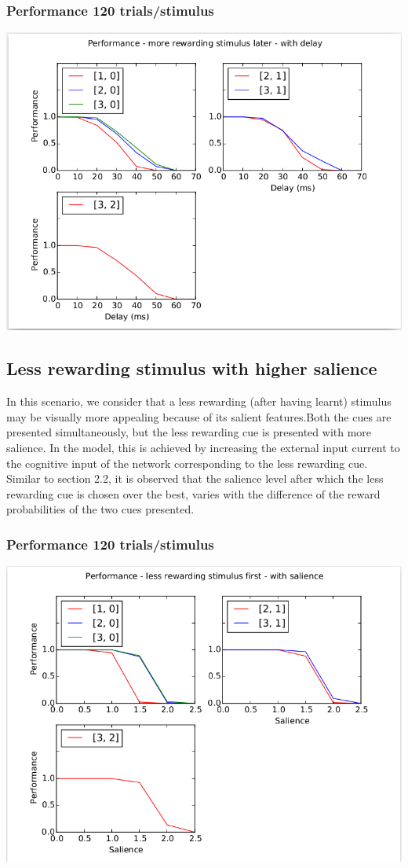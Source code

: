 \documentclass[11pt]{article}
\begin{document}
\subsubsection{Performance 120 trials/stimulus}
\includegraphics[clip=true, trim=25 35 0 35, scale=.7]{perf_with_delays.png}

\subsection{Less rewarding stimulus with higher salience}
In this scenario, we consider that a less rewarding (after having learnt) stimulus may be visually more appealing because of its salient features.Both the cues are presented simultaneously, but the less rewarding cue is presented with more salience. In the model, this is achieved by increasing the external input current to the cognitive input of the network corresponding to the less rewarding cue. 
\\
Similar to section 2.2, it is observed that the salience level after which the less rewarding cue is chosen over the best, varies with the difference of the reward probabilities of the two cues presented.
\subsubsection{Performance 120 trials/stimulus}
\includegraphics[clip=true, trim=25 35 0 35, scale=.7]{perf_with_salience.png}
\end{document}

